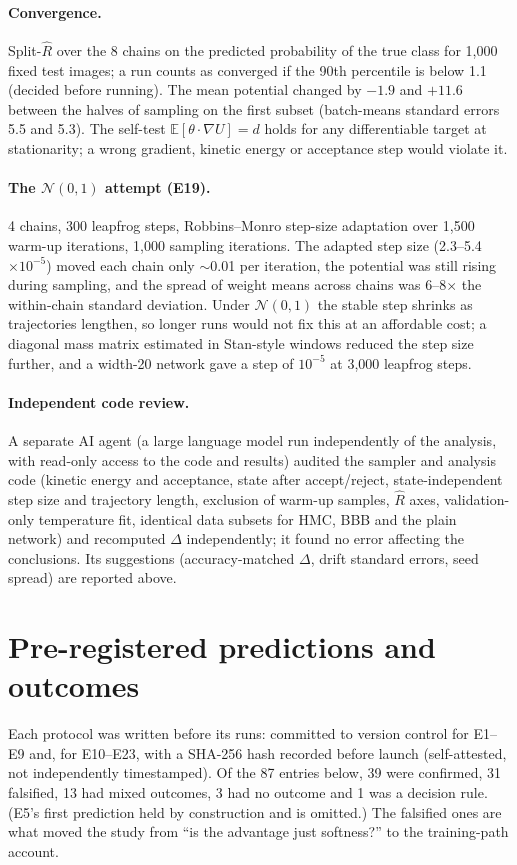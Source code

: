 \documentclass[10pt]{article}
\begin{document}
\paragraph{Convergence.} Split-$\hat R$ over the 8 chains on the predicted
probability of the true class for 1{,}000 fixed test images; a run counts as
converged if the 90th percentile is below 1.1 (decided before running). The
mean potential changed by $-1.9$ and $+11.6$ between the halves of sampling on
the first subset (batch-means standard errors 5.5 and 5.3). The self-test
$\mathbb E[\theta\cdot\nabla U]=d$ holds for any differentiable target at
stationarity; a wrong gradient, kinetic energy or acceptance step would
violate it.

\paragraph{The $\mathcal N(0,1)$ attempt (E19).} 4 chains, 300 leapfrog steps,
Robbins--Monro step-size adaptation over 1{,}500 warm-up iterations, 1{,}000
sampling iterations. The adapted step size (2.3--5.4$\times10^{-5}$) moved each
chain only $\sim$0.01 per iteration, the potential was still rising during
sampling, and the spread of weight means across chains was 6--8$\times$ the
within-chain standard deviation. Under $\mathcal N(0,1)$ the stable step
shrinks as trajectories lengthen, so longer runs would not fix this at an
affordable cost; a diagonal mass matrix estimated in Stan-style windows
reduced the step size further, and a width-20 network gave a step of
$10^{-5}$ at 3{,}000 leapfrog steps.

\paragraph{Independent code review.} A separate AI agent (a large language
model run independently of the analysis, with read-only access to the code and
results) audited the sampler and analysis code (kinetic energy and acceptance, state after accept/reject,
state-independent step size and trajectory length, exclusion of warm-up
samples, $\hat R$ axes, validation-only temperature fit, identical data
subsets for HMC, BBB and the plain network) and recomputed $\Delta$
independently; it found no error affecting the conclusions. Its suggestions
(accuracy-matched $\Delta$, drift standard errors, seed spread) are reported
above.

\section{Pre-registered predictions and outcomes}\label{app:ledger}
Each protocol was written before its runs: committed to version control for
E1--E9 and, for E10--E23, with a SHA-256 hash recorded before launch
(self-attested, not independently timestamped). Of the 87 entries below, 39
were confirmed, 31 falsified, 13 had mixed outcomes, 3 had no outcome and 1
was a decision rule. (E5's first prediction held by construction and is
omitted.) The falsified ones are what moved the study from ``is the
advantage just softness?'' to the training-path account.
\end{document}
